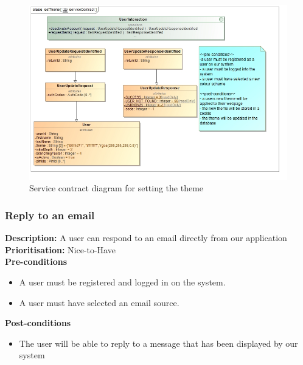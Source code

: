 \documentclass[hidelinks,english]{article}
\begin{document}
    			\begin{figure}[!h]
    			\includegraphics[width=\linewidth]{setThemeServiceContract.jpg}
    			\caption{Service contract diagram for setting the theme}
    			\label{ServiceContractSeTheme}
    			\end{figure}
    	    
    	    
    		\subsubsection{Reply to an email}
				\textbf{Description:}  A user can respond to an email directly from our application\\
			    \textbf{Prioritisation:} Nice-to-Have\\
      			\textbf{Pre-conditions}
			    \begin{itemize}
			        \item A user must be registered and logged in on the system.
			        \item A user must have selected an email source.
			    \end{itemize}
    			\textbf{Post-conditions}
			    \begin{itemize}
			    	\item The user will be able to reply to a message that has been displayed by our system
    			\end{itemize}
    			
\end{document}
